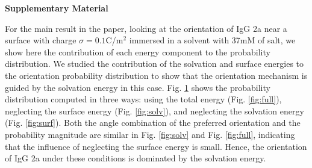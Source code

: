 \documentclass[aip,notitlepage,reprint]{revtex4-1}
\begin{document}
\begin{center}
\textbf{Supplementary Material}
\end{center}
For the main result in the paper, looking at the orientation of IgG 2a near a surface with charge $\sigma=0.1$C/m$^2$ immersed in a solvent with 37mM of salt, we show here the contribution of each energy component to the probability distribution.
We studied the contribution of the solvation and surface energies to the orientation probability distribution to show that the orientation mechanism is guided by the solvation energy in this case.
Fig. \ref{fig:supp} shows the probability distribution computed in three ways: using the total energy (Fig. \ref{fig:full}), neglecting the surface energy (Fig. \ref{fig:solv}), and neglecting the solvation energy (Fig. \ref{fig:surf}). 
Both the angle combination of the preferred orientation and the probability magnitude are similar in Fig. \ref{fig:solv} and Fig. \ref{fig:full}, indicating that the influence of neglecting the surface energy is small.
Hence, the orientation of IgG 2a under these conditions is dominated by the solvation energy.


\begin{figure} 
   \centering
   \\
   \\
   \caption{}
   \label{fig:supp}
\end{figure}

\clearpage
\end{document}
